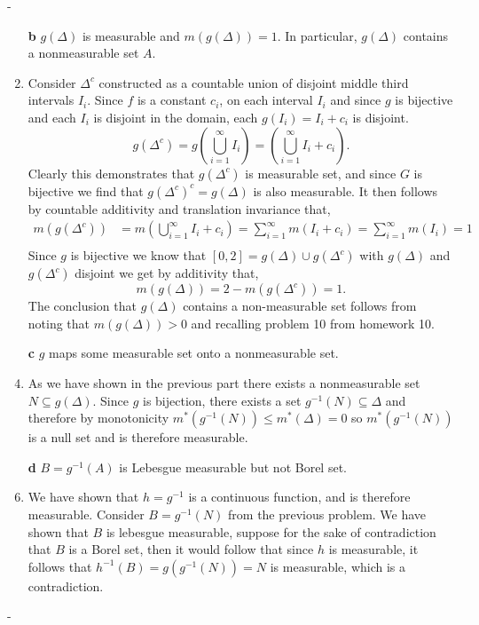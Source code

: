 \documentclass[12pt]{article}
\makeatletter
\theoremstyle{ex215}
\newcounter{probcount}
\newlength\probsep
\newlength\pshrinking
\newenvironment{problems}%
  {\ifhmode\unskip\par\fi\setcounter{probcount}{0}\probsep\parskip
  \sbox\@tempboxa{\textbf{9.}}\pshrinking\wd\@tempboxa\advance\pshrinking\labelsep
  \advance\linewidth -\pshrinking
  \advance\@totalleftmargin\pshrinking
  \advance\leftskip\pshrinking}%
  {\ifhmode\unskip \par\fi\advance\leftskip-\pshrinking}%
\renewenvironment{proof}[1][\proofname]{\par
  \pushQED{\qed}%
  \normalfont \topsep6\p@\@plus6\p@\relax
  \trivlist
  \@topsep \topsep
  \item[\hskip\labelsep
        \itshape
    #1\@addpunct{.}]\ignorespaces
}{%
  \popQED\endtrivlist\@endpefalse
}
\makeatother
\begin{document}
\begin{problems}
\begin{enumerate}
  
    \item[\textbf{b}] $g(\Delta)$ is measurable and $m(g(\Delta)) = 1$. In particular, $g(\Delta)$ contains a nonmeasurable set $A$. 
    \begin{proof} Consider $\Delta^c$ constructed as a countable union of disjoint middle third intervals $I_i$. Since $f$ is a constant $c_i$, on each interval $I_i$ and since $g$ is bijective and each $I_i$ is disjoint in the domain, each $g(I_i) = I_i + c_i$ is disjoint. 
      \begin{equation*}
        g(\Delta^c) = g\left(\bigcup_{i = 1}^\infty I_i\right) = \left(\bigcup_{i = 1}^\infty I_i + c_i\right).
      \end{equation*}
      Clearly this demonstrates that $g(\Delta^c)$ is measurable set, and since $G$ is bijective we find that $g(\Delta^c)^c = g(\Delta)$ is also measurable. It then follows by countable additivity and translation invariance that,  
      \begin{align*}
        m(g(\Delta^c)) &= m\left(\bigcup_{i = 1}^\infty I_i + c_i\right) = \sum_{i = 1}^\infty m(I_i + c_i) = \sum_{i = 1}^\infty m(I_i) = 1 \\
      \end{align*}  
      Since $g$ is bijective we know that $[0, 2] = g(\Delta) \cup g(\Delta^c)$ with $g(\Delta)$ and $g(\Delta^c)$ disjoint we get by additivity that, 
      \begin{equation*}
        m(g(\Delta)) = 2 - m(g(\Delta^c)) = 1. 
      \end{equation*}
      The conclusion that $g(\Delta)$ contains a non-measurable set follows from noting that $m(g(\Delta)) > 0$ and recalling problem 10 from homework 10. 
      
    \end{proof}
    
    

    \item[\textbf{c}] $g$ maps some measurable set onto a nonmeasurable set.
    \begin{proof} As we have shown in the previous part there exists a nonmeasurable set $N \subseteq g(\Delta)$. Since $g$ is bijection, there exists a set $g^{-1}(N) \subseteq \Delta$ and therefore by monotonicity 
      $m^*(g^{-1}(N)) \leq m^*(\Delta) = 0$ so $m^*(g^{-1}(N))$ is a null set and is therefore measurable.
    \end{proof}


    \item[\textbf{d}] $B = g^{-1}(A)$ is Lebesgue measurable but not Borel set. 
    \begin{proof} We have shown that $h = g^{-1}$ is a continuous function, and is therefore measurable. Consider $B = g^{-1}(N)$ from the previous problem. We have shown that $B$ is lebesgue measurable, suppose for the sake of contradiction that $B$ is a Borel set, then it would follow that since $h$ is measurable, it follows that $h^{-1}(B) = g(g^{-1}(N)) = N$ is measurable, which is a contradiction. 
    \end{proof}
    




\end{enumerate}
\end{problems}
\end{document}
